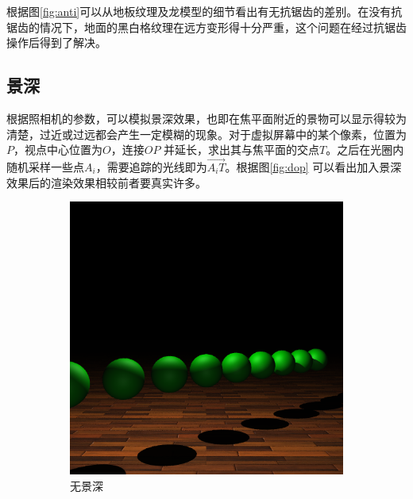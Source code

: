 根据图\ref{fig:anti}可以从地板纹理及龙模型的细节看出有无抗锯齿的差别。在没有抗锯齿的情况下，地面的黑白格纹理在远方变形得十分严重，这个问题在经过抗锯齿操作后得到了解决。

\subsection {景深}
根据照相机的参数，可以模拟景深效果，也即在焦平面附近的景物可以显示得较为清楚，过近或过远都会产生一定模糊的现象。对于虚拟屏幕中的某个像素，位置为$P$，视点中心位置为$O$，连接$OP$ 并延长，求出其与焦平面的交点$T$。之后在光圈内随机采样一些点$A_{i}$，需要追踪的光线即为$\overrightarrow{A_{i}T}$。根据图\ref{fig:dop} 可以看出加入景深效果后的渲染效果相较前者要真实许多。
\begin{figure}
    \centering
    \begin{subfigure}{0.45\textwidth}
        \includegraphics[width=\textwidth]{./img/without_dop.png}
        \caption{无景深}
    \end{subfigure}
    ~
    \begin{subfigure}{0.45\textwidth}

\end{subfigure}
\end{figure}
